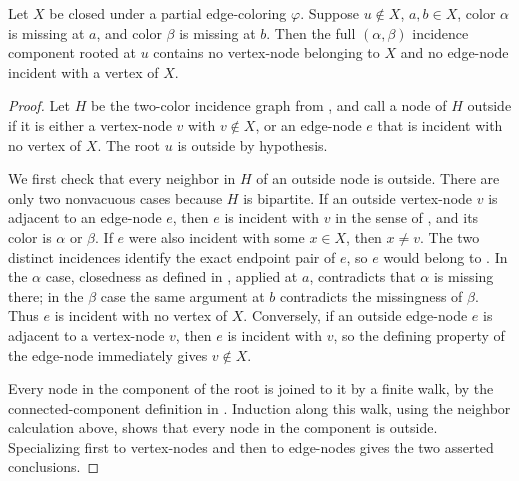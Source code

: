 \begin{helper}
Let $X$ be closed under a partial edge-coloring $\varphi$.  Suppose
$u\notin X$, $a,b\in X$, color $\alpha$ is missing at $a$, and color
$\beta$ is missing at $b$.  Then the full $(\alpha,\beta)$ incidence
component rooted at $u$ contains no vertex-node belonging to $X$ and no
edge-node incident with a vertex of $X$.
\end{helper}
\begin{proof}
Let $H$ be the two-color incidence graph from
, and call a node of $H$ outside if it is
either a vertex-node $v$ with $v\notin X$, or an edge-node $e$ that is
incident with no vertex of $X$.  The root $u$ is outside by hypothesis.

We first check that every neighbor in $H$ of an outside node is outside.
There are only two nonvacuous cases because $H$ is bipartite.  If an
outside vertex-node $v$ is adjacent to an edge-node $e$, then $e$ is
incident with $v$ in the sense of , and its color is
$\alpha$ or $\beta$.  If $e$ were also
incident with some $x\in X$, then $x\ne v$.  The two distinct incidences
identify the exact endpoint pair of $e$, so $e$ would belong to
.  In the $\alpha$ case, closedness as defined in
, applied at $a$, contradicts that
$\alpha$ is missing there; in the $\beta$ case the same argument at $b$
contradicts the missingness of $\beta$.  Thus $e$ is incident with no
vertex of $X$.  Conversely, if an outside edge-node $e$ is adjacent to a
vertex-node $v$, then $e$ is incident with $v$, so the defining property
of the edge-node immediately gives $v\notin X$.

Every node in the component of the root is joined to it by a finite walk,
by the connected-component definition in .
Induction along this walk, using the neighbor calculation above, shows
that every node in the component is outside.  Specializing first to
vertex-nodes and then to edge-nodes gives the two asserted conclusions.
\end{proof}
